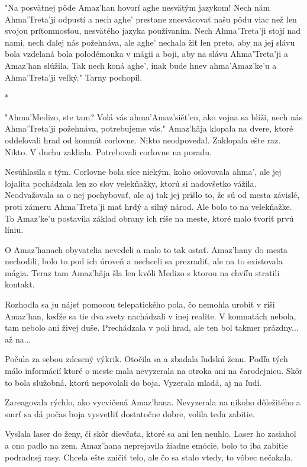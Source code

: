 \documentclass{book}
\begin{document}
"$ $Na posvätnej pôde Amaz'han hovorí aghe nesvätým jazykom! Nech nám Ahma'Treta'ji odpustí a nech aghe' prestane znesväcovať našu pôdu viac než len svojou prítomnosťou, nesvätého jazyka používaním. Nech Ahma'Treta'ji stojí nad nami, nech ďalej nás požehnáva, ale aghe' nechala žiť len preto, aby na jej slávu bola vzdelaná bola polodémonka v mágii a boji, aby na slávu Ahma'Treta'ji a Amaz'han slúžila. Tak nech koná aghe', inak bude hnev ahma'Amaz'ke'u a Ahma'Treta'ji veľký."$ $ Tarny pochopil.

\begin{center}
*
\end{center}

"$ $Ahma'Medizo, ste tam? Volá vás ahma'Amaz'sie\v{}t'en, ako vojna sa blíži, nech nás Ahma'Treta'ji požehnáva, potrebujeme vás."$ $ Amaz'ha\v{}ja klopala na dvere, ktoré oddeľovali hrad od komnát corlovne. Nikto neodpovedal. Zaklopala ešte raz. Nikto. V duchu zakliala. Potrebovali corlovne na poradu.

Nesúhlasila s tým. Corlovne bola síce niekým, koho oslovovala ahma', ale jej lojalita pochádzala len zo slov velekňažky, ktorú si nadovšetko vážila. Neodvažovala sa o nej pochybovať, ale aj tak jej prišlo to, že sú od mesta závislé, proti zámeru Ahma'Treta'ji mať hrdý a silný národ. Ale bolo to na velekňažke. To Amaz'ke'u postavila základ obrany ich ríše na meste, ktoré malo tvoriť prvú líniu.

O Amaz'hanach obyvatelia nevedeli a malo to tak ostať. Amaz'hany do mesta nechodili, bolo to pod ich úroveň a nechceli sa prezradiť, ale na to existovala mágia. Teraz tam Amaz'ha\v{}ja šla len kvôli Medizo s ktorou na chvíľu stratili kontakt.

Rozhodla sa ju nájsť pomocou telepatického poľa, čo nemohla urobiť v ríši Amaz'han, keďže sa tie dva svety nachádzali v inej realite. V komnatách nebola, tam nebolo ani živej duše. Prechádzala v poli hrad, ale ten bol takmer prázdny... až na...

Počula za sebou zdesený výkrik. Otočila sa a zbadala ľudskú ženu. Podľa tých málo informácií ktoré o meste mala nevyzerala na otroka ani na čarodejnicu. Skôr to bola služobná, ktorú nepovolali do boja. Vyzerala mladá, aj na ľudí.

Zareagovala rýchlo, ako vycvičená Amaz'hana. Nevyzerala na nikoho dôležitého a smrť sa dá počas boja vysvetliť dostatočne dobre, volila teda zabitie.

Vyslala laser do ženy, či skôr dievčaťa, ktoré sa ani len neuhlo. Laser ho zasiahol a ono padlo na zem. Amaz'hana neprejavila žiadne emócie, bolo to iba zabitie podradnej rasy. Chcela ešte zničiť telo, ale čo sa stalo vtedy, to vôbec nečakala.
\end{document}
